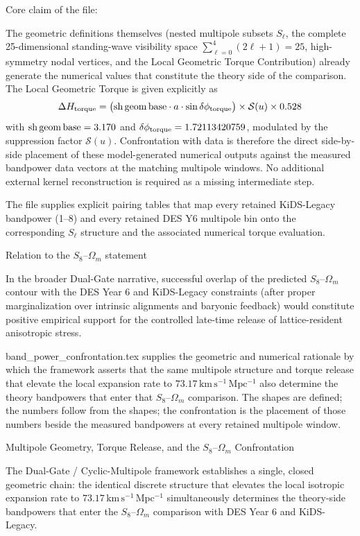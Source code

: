 Core claim of the file:

The geometric definitions themselves (nested multipole subsets \(S_\ell\), the complete 25-dimensional standing-wave visibility space \(\sum_{\ell=0}^{4}(2\ell+1)=25\), high-symmetry nodal vertices, and the Local Geometric Torque Contribution) already generate the numerical values that constitute the theory side of the comparison.
The Local Geometric Torque is given explicitly as
  \[
  \Delta H_{\rm torque}=\bigl({\rm sh\,geom\,base}\cdot a\cdot\sin\delta\phi_{\rm torque}\bigr)\times\mathcal{S}(u)\times0.528
  \]
  with \({\rm sh\,geom\,base}=3.170\) and \(\delta\phi_{\rm torque}=1.72113420759\), modulated by the suppression factor \(\mathcal{S}(u)\).
Confrontation with data is therefore the direct side-by-side placement of these model-generated numerical outputs against the measured bandpower data vectors at the matching multipole windows. No additional external kernel reconstruction is required as a missing intermediate step.

The file supplies explicit pairing tables that map every retained KiDS-Legacy bandpower (1–8) and every retained DES Y6 multipole bin onto the corresponding \(S_\ell\) structure and the associated numerical torque evaluation.

Relation to the \(S_8\)–\(\Omega_m\) statement

In the broader Dual-Gate narrative, successful overlap of the predicted \(S_8\)–\(\Omega_m\) contour with the DES Year 6 and KiDS-Legacy constraints (after proper marginalization over intrinsic alignments and baryonic feedback) would constitute positive empirical support for the controlled late-time release of lattice-resident anisotropic stress.  

band_power_confrontation.tex supplies the geometric and numerical rationale by which the framework asserts that the same multipole structure and torque release that elevate the local expansion rate to \(73.17\,\mathrm{km\,s^{-1}\,Mpc^{-1}}\) also determine the theory bandpowers that enter that \(S_8\)–\(\Omega_m\) comparison. The shapes are defined; the numbers follow from the shapes; the confrontation is the placement of those numbers beside the measured bandpowers at every retained multipole window.

Multipole Geometry, Torque Release, and the \(S_8\)–\(\Omega_m\) Confrontation

The Dual-Gate / Cyclic-Multipole framework establishes a single, closed geometric chain: the identical discrete structure that elevates the local isotropic expansion rate to \(73.17\,\mathrm{km\,s^{-1}\,Mpc^{-1}}\) simultaneously determines the theory-side bandpowers that enter the \(S_8\)–\(\Omega_m\) comparison with DES Year 6 and KiDS-Legacy.

